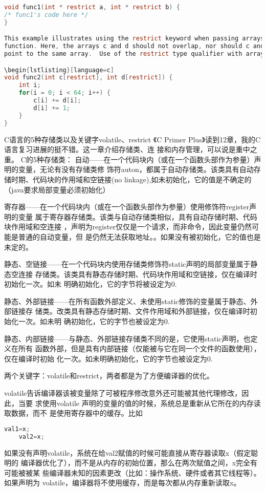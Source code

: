 \documentclass[a4paper,11pt]{book}
\begin{document}
\begin{lstlisting}[language=c]
void func1(int * restrict a, int * restrict b) { 
/* func1's code here */ 
} 

This example illustrates using the restrict keyword when passing arrays to a
function. Here, the arrays c and d should not overlap, nor should c and d
point to the same array.  Use of the restrict type qualifier with arrays 

\begin{lstlisting}[language=c]
void func2(int c[restrict], int d[restrict]) { 
    int i;
    for(i = 0; i < 64; i++) { 
        c[i] += d[i]; 
        d[i] += 1; 
    } 
}
\end{lstlisting}

C语言的5种存储类以及关键字volatile、restrict 
    《C Primer Plus》读到12章，我的C语言复习进展的挺不错。这一章介绍存储类、连
接和内存管理，可以说是重中之重。
C的5种存储类：
自动——在一个代码块内（或在一个函数头部作为参量）声明的变量，无论有没有存储类修
饰符auton，都属于自动存储类。该类具有自动存储时期、代码块的作用域和空链接(no
linkage),如未初始化，它的值是不确定的（java要求局部变量必须初始化）

寄存器——在一个代码块内（或在一个函数头部作为参量）使用修饰符register声明的变量
属于寄存器存储类。该类与自动存储类相似，具有自动存储时期、代码块作用域和空连接
，声明为register仅仅是一个请求，而非命令，因此变量仍然可能是普通的自动变量，但
是仍然无法获取地址。。如果没有被初始化，它的值也是未定的。

静态、空链接——在一个代码块内使用存储类修饰符static声明的局部变量属于静态空连接
存储类。该类具有静态存储时期、代码块作用域和空链接，仅在编译时初始化一次。如未
明确初始化，它的字节将被设定为0.

静态、外部链接——在所有函数外部定义、未使用static修饰的变量属于静态、外部链接存
储类。改类具有静态存储时期、文件作用域和外部链接，仅在编译时初始化一次。如未明
确初始化，它的字节也被设定为0.

静态、内部链接——与静态、外部链接存储类不同的是，它使用static声明，也定义在所有
函数外部，但是具有内部链接（仅能被与它在同一个文件的函数使用），仅在编译时初始
化一次。如未明确初始化，它的字节也被设定为0.

两个关键字：volatile和restrict，两者都是为了方便编译器的优化。

volatile告诉编译器该被变量除了可被程序修改意外还可能被其他代理修改，因此，当要
求使用volatile 声明的变量的值的时候，系统总是重新从它所在的内存读取数据，而不
是使用寄存器中的缓存。比如
\begin{lstlisting}[language=c]
    val1=x;
    val2=x;
\end{lstlisting}
如果没有声明volatile，系统在给val2赋值的时候可能直接从寄存器读取x（假定聪明的
编译器优化了），而不是从内存的初始位置，那么在两次赋值之间，x完全有可能被被某
些编译器未知的因素更改（比如：操作系统、硬件或者其它线程等）。如果声明为
volatile，编译器将不使用缓存，而是每次都从内存重新读取x。
\end{document}

